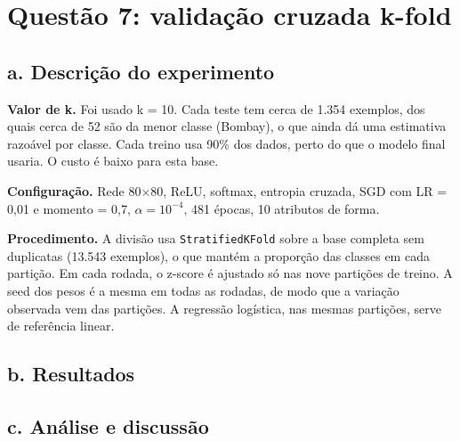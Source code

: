 \section{Questão 7: validação cruzada k-fold}

\subsection*{a. Descrição do experimento}

\textbf{Valor de k.} Foi usado k = 10. Cada teste tem cerca de 1.354 exemplos, dos quais cerca de 52 são da menor classe (Bombay), o que ainda dá uma estimativa razoável por classe. Cada treino usa 90\% dos dados, perto do que o modelo final usaria. O custo é baixo para esta base.

\textbf{Configuração.} Rede 80$\times$80, ReLU, softmax, entropia cruzada, SGD com LR = 0,01 e momento = 0,7, $\alpha = 10^{-4}$, 481 épocas, 10 atributos de forma.

\textbf{Procedimento.} A divisão usa \texttt{StratifiedKFold} sobre a base completa sem duplicatas (13.543 exemplos), o que mantém a proporção das classes em cada partição. Em cada rodada, o z-score é ajustado só nas nove partições de treino. A seed dos pesos é a mesma em todas as rodadas, de modo que a variação observada vem das partições.
A regressão logística, nas mesmas partições, serve de referência linear.

\subsection*{b. Resultados}


\subsection*{c. Análise e discussão}

